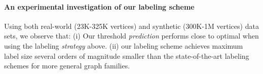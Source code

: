 \paragraph{An experimental investigation  of our labeling scheme}
Using both real-world (23K-325K vertices) and synthetic (300K-1M vertices) data sets, we observe that:
(i) Our threshold \emph{prediction} performs close to optimal when using the labeling \emph{strategy} above. 
(ii) our labeling scheme achieves maximum label size several orders of magnitude smaller than the state-of-the-art labeling schemes for more general graph families.
\vspace{\baselineskip}









